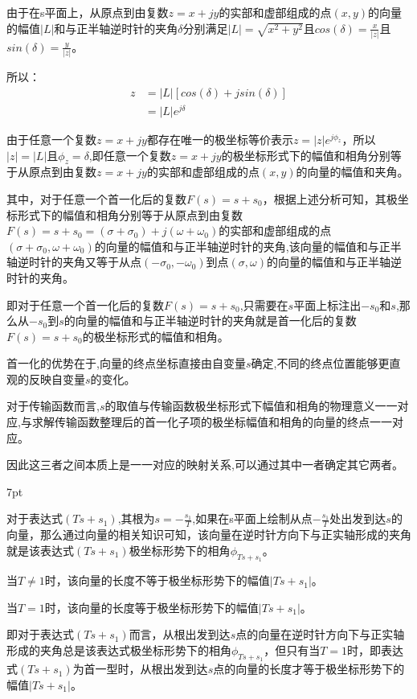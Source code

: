 \documentclass{article}
\numberwithin{equation}{section}
\numberwithin{figure}{section}
\newenvironment{formal}{%
\def\FrameCommand{%
\hspace{1pt}%
{\color{DarkBlue}\vrule width 2pt}%
{\color{formalshade}\vrule width 4pt}%
\colorbox{formalshade}%
}%
\MakeFramed{\advance\hsize-\width\FrameRestore}%
\noindent\hspace{-4.55pt}%
\begin{adjustwidth}{}{7pt}%
\vspace{2pt}\vspace{2pt}%
}
{%
\vspace{2pt}\end{adjustwidth}\endMakeFramed%
}
\begin{document}
由于在s平面上，从原点到由复数$z=x+jy$的实部和虚部组成的点$(x,y)$的向量的幅值$|L|$和与正半轴逆时针的夹角$\delta$分别满足$|L|=\sqrt{x^2+y^2}$且$cos(\delta)=\frac{x}{|z|}$且$sin(\delta)=\frac{y}{|z|}$。

所以：
\begin{equation}
    \begin{split}
        z&=|L|[cos(\delta)+jsin(\delta)]\\
        &=|L|e^{j\delta}
    \end{split}
\end{equation}

由于任意一个复数$z=x+jy$都存在唯一的极坐标等价表示$z=|z|e^{j\phi_z}$，所以$|z|=|L|$且$\phi_z=\delta$,即任意一个复数$z=x+jy$的极坐标形式下的幅值和相角分别等于从原点到由复数$z=x+jy$的实部和虚部组成的点$(x,y)$的向量的幅值和夹角。

其中，对于任意一个首一化后的复数$F(s)=s+s_0$，根据上述分析可知，其极坐标形式下的幅值和相角分别等于从原点到由复数$F(s)=s+s_0=(\sigma+\sigma_0)+j(\omega+\omega_0)$的实部和虚部组成的点$(\sigma+\sigma_0,\omega+\omega_0)$的向量的幅值和与正半轴逆时针的夹角,该向量的幅值和与正半轴逆时针的夹角又等于从点$(-\sigma_0,-\omega_0)$到点$(\sigma,\omega)$的向量的幅值和与正半轴逆时针的夹角。

即对于任意一个首一化后的复数$F(s)=s+s_0$,只需要在$s$平面上标注出$-s_0$和$s$,那么从$-s_0$到$s$的向量的幅值和与正半轴逆时针的夹角就是首一化后的复数$F(s)=s+s_0$的极坐标形式的幅值和相角。

首一化的优势在于,向量的终点坐标直接由自变量$s$确定,不同的终点位置能够更直观的反映自变量$s$的变化。

对于传输函数而言,$s$的取值与传输函数极坐标形式下幅值和相角的物理意义一一对应,与求解传输函数整理后的首一化子项的极坐标幅值和相角的向量的终点一一对应。

因此这三者之间本质上是一一对应的映射关系,可以通过其中一者确定其它两者。

\begin{formal}
    对于表达式$(Ts+s_1)$,其根为$s=-\frac{s_1}{T}$,如果在s平面上绘制从点$-\frac{s_1}{T}$处出发到达$s$的向量，那么通过向量的相关知识可知，该向量在逆时针方向下与正实轴形成的夹角就是该表达式$(Ts+s_1)$极坐标形势下的相角$\phi_{Ts+s_1}$。

    当$T\neq 1$时，该向量的长度不等于极坐标形势下的幅值$|Ts+s_1|$。

    当$T=1$时，该向量的长度等于极坐标形势下的幅值$|Ts+s_1|$。
\end{formal}

即对于表达式$(Ts+s_1)$而言，从根出发到达$s$点的向量在逆时针方向下与正实轴形成的夹角总是该表达式极坐标形势下的相角$\phi_{Ts+s_1}$，但只有当$T=1$时，即表达式$(Ts+s_1)$为首一型时，从根出发到达$s$点的向量的长度才等于极坐标形势下的幅值$|Ts+s_1|$。
\end{document}
